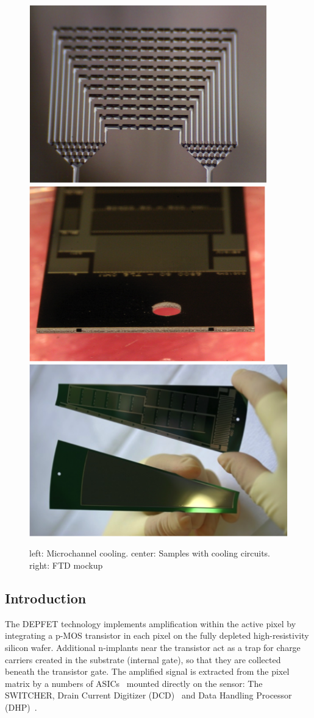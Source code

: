 \begin{figure}
    \centering
    \includegraphics[width=.3\linewidth]{VertexDetector/DEPFET/microChannel}
    \includegraphics[width=.3\linewidth]{VertexDetector/DEPFET/microChannelSamples}
    \includegraphics[width=.3\linewidth]{VertexDetector/DEPFET/FTD_Mockup}
    \caption{left: Microchannel cooling. center: Samples with cooling circuits. right: FTD mockup}
    \label{fig:VertexDetector:DEPFET}
\end{figure}

\subsection{Introduction}
The DEPFET technology implements amplification within the active pixel by integrating a p-MOS transistor in each pixel on the fully depleted high-resistivity silicon wafer. Additional n-implants near the transistor act as a trap for charge carriers created in the substrate (internal gate), so that they are collected beneath the transistor gate. The amplified signal is extracted from the pixel matrix by a numbers of ASICs~\cite{Kishishita:2014maa,Krueger2010337} mounted directly on the sensor: The SWITCHER, Drain Current Digitizer (DCD)~\cite{1748-0221-6-01-C01085,5446501} and Data Handling Processor (DHP)~\cite{1748-0221-7-01-C01069}.


